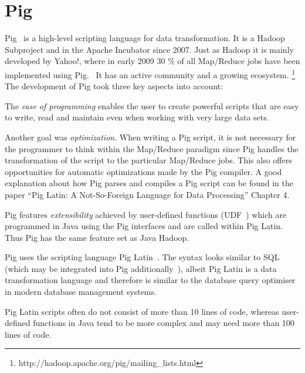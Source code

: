 \section{Pig}

Pig~\cite{pigWebsite} is a high-level scripting language for data transformation. It is a Hadoop Subproject and in the Apache Incubator since 2007. Just as Hadoop it is mainly developed by Yahoo!, where in early 2009 30 \% of all Map/Reduce jobs have been implemented using Pig.~\cite{pig30percent} It has an active community and a growing ecosystem. \footnote{http://hadoop.apache.org/pig/mailing\_lists.html}\\
The development of Pig took three key aspects into account:~\cite{pigWebsite}

The \emph{ease of programming} enables the user to create powerful scripts that are easy to write, read and maintain even when working with very large data sets.

Another goal was \emph{optimization}. When writing a Pig script, it is not necessary for the programmer to think within the Map/Reduce paradigm since Pig handles the transformation of the script to the particular Map/Reduce jobs. This also offers opportunities for automatic optimizations made by the Pig compiler. A good explanation about how Pig parses and compiles a Pig script can be found in the paper ``Pig Latin: A Not-So-Foreign Language for Data Processing'' Chapter 4.~\cite{pigNotForeign}

Pig features \emph{extensibility} achieved by user-defined functions (UDF~\cite{pigUdf}) which are programmed in Java using the Pig interfaces and are called within Pig Latin. Thus Pig has the same feature set as Java Hadoop.

Pig uses the scripting language Pig Latin~\cite{pigManual}. The syntax looks similar to SQL (which may be integrated into Pig additionally~\cite{pigSql}), albeit Pig Latin is a data transformation language and therefore is similar to the database query optimiser in modern database management systems.

Pig Latin scripts often do not consist of more than 10 lines of code, whereas user-defined functions in Java tend to be more complex and may need more than 100 lines of code.
                                                                                                               